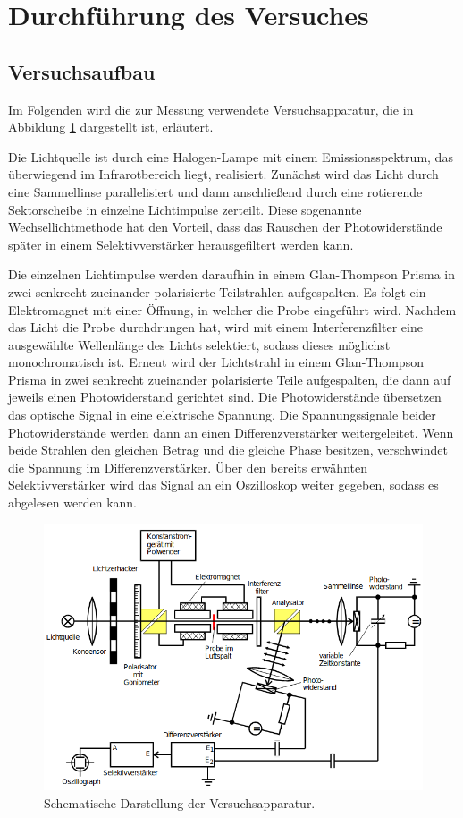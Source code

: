 \section{Durchführung des Versuches}
\label{sec:Durchführung}
\subsection{Versuchsaufbau}
Im Folgenden wird die zur Messung verwendete Versuchsapparatur, die in Abbildung \ref{fig:apparatur} dargestellt ist, erläutert.

\noindent
Die Lichtquelle ist durch eine Halogen-Lampe mit einem Emissionsspektrum, das überwiegend im Infrarotbereich liegt, realisiert. 
Zunächst wird das Licht durch eine Sammellinse parallelisiert und dann anschließend durch eine rotierende Sektorscheibe in 
einzelne Lichtimpulse zerteilt. 
Diese sogenannte Wechsellichtmethode hat den Vorteil, dass das Rauschen der Photowiderstände später in einem Selektivverstärker
herausgefiltert werden kann.

\noindent
Die einzelnen Lichtimpulse werden daraufhin in einem Glan-Thompson Prisma in zwei senkrecht 
zueinander polarisierte Teilstrahlen aufgespalten. Es folgt ein Elektromagnet mit einer Öffnung, in welcher die Probe eingeführt
wird. Nachdem das Licht die Probe durchdrungen hat, wird mit einem Interferenzfilter eine ausgewählte Wellenlänge des Lichts 
selektiert, sodass dieses möglichst monochromatisch ist. Erneut wird der Lichtstrahl in einem Glan-Thompson Prisma in zwei 
senkrecht zueinander polarisierte Teile aufgespalten, die dann auf jeweils einen Photowiderstand gerichtet sind. Die Photowiderstände
übersetzen das optische Signal in eine elektrische Spannung. Die Spannungssignale beider Photowiderstände werden dann an einen
Differenzverstärker weitergeleitet. Wenn beide Strahlen den gleichen Betrag und die gleiche Phase besitzen, verschwindet die Spannung
im Differenzverstärker. Über den bereits erwähnten Selektivverstärker wird das Signal an ein Oszilloskop weiter gegeben, sodass
es abgelesen werden kann.   

\begin{figure}[H]
    \centering
    \includegraphics[scale=0.7]{pictures/Versuchsaufbau.png}
    \caption{Schematische Darstellung der Versuchsapparatur. \cite{Versuchsbeschreibung}}
    \label{fig:apparatur}
\end{figure}

